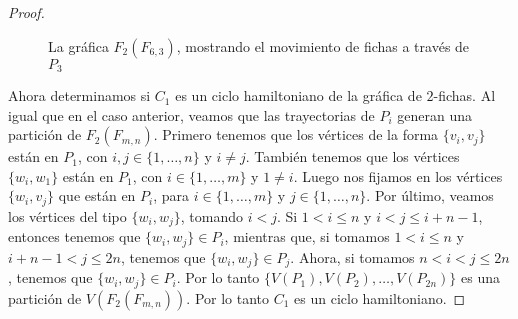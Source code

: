 \begin{proof}
\begin{figure}[ht!]
        \caption{La gr\'afica $F_2(F_{6,3})$, mostrando el movimiento de fichas
        a trav\'es de $P_3$ }
        \label{fig:exe-tray-n-2n}
    \end{figure}
    
    Ahora determinamos si $C_1$ es un ciclo hamiltoniano de la gr\'afica de
    $2$-fichas. Al igual que en el caso anterior, veamos que las trayectorias de
    $P_i$ generan una partici\'on de $F_2(F_{m,n})$. Primero tenemos que los
    v\'ertices de la forma $\{v_i,v_j\}$ est\'an en $P_1$, con $i,j \in \{1,
    \dots, n\}$ y $i \neq j$. Tambi\'en tenemos que los v\'ertices $\{w_i,w_1\}$
    est\'an en $P_1$, con $i \in \{1, \dots, m\}$ y $1 \neq i$. Luego nos
    fijamos en los v\'ertices $\{w_i,v_j\}$ que est\'an en $P_i$, para $i\in
    \{1, \dots, m\}$ y $j \in \{1, \dots, n\}$. Por \'ultimo, veamos los
    v\'ertices del tipo $\{w_i,w_j\}$, tomando $i < j$. Si $1 < i \leq n$ y $i <
    j \leq i+n-1$, entonces tenemos que $\{w_i,w_j\} \in P_i$, mientras que, si
    tomamos $1 < i \leq n$ y $i+n-1 < j \leq 2n$, tenemos que $\{w_i,w_j\} \in
    P_j$. Ahora, si tomamos $n<i<j \leq 2n$, tenemos que $\{w_i,w_j\} \in P_i$.
    Por lo tanto $\{V(P_1),V(P_2), \dots, V(P_{2n})\}$ es una partici\'on de
    $V(F_2(F_{m,n}))$. Por lo tanto $C_1$ es un ciclo hamiltoniano.


\end{proof}
